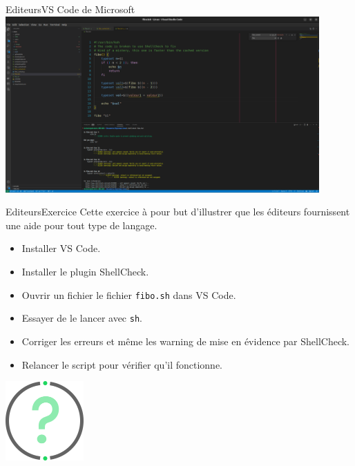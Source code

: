 \documentclass{beamer}
\begin{document}
    \begin{frame}{Editeurs}{VS Code de Microsoft}
        \centering
        \includegraphics[width=12cm]{image/shellcheck-warning}
    \end{frame}

    \begin{frame}{Editeurs}{Exercice \execcounterdispinc}
        Cette exercice à pour but d'illustrer que les éditeurs fournissent une aide pour tout type de langage.
        \begin{itemize}
            \item Installer VS Code.
            \item Installer le plugin ShellCheck.
            \item Ouvrir un fichier le fichier \lstinline{fibo.sh} dans VS Code.
            \item Essayer de le lancer avec \lstinline{sh}.
            \item Corriger les erreurs et même les warning de mise en évidence par ShellCheck.
            \item Relancer le script pour vérifier qu'il fonctionne.
        \end{itemize}
        \bigbreak
        \centering
        \includegraphics[width=3cm]{image/question-mark}
    \end{frame}
\end{document}
